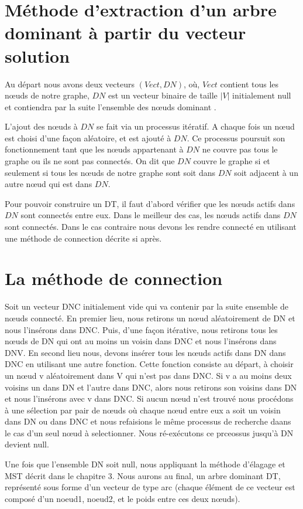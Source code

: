 \section{Méthode d'extraction d'un arbre dominant à partir du vecteur solution}
Au départ nous avons deux vecteurs $(Vect, DN)$, où, $Vect$ contient tous les nœuds de notre graphe, $DN$ est un vecteur binaire de taille $|V|$ initialement null et contiendra par la suite l’ensemble des nœuds dominant .

L’ajout des nœuds à $DN$ se fait via un processus itératif. A chaque fois un nœud est choisi d’une façon aléatoire,  et est ajouté à $DN$. Ce processus poursuit son fonctionnement tant que les nœuds appartenant à $DN$ ne couvre pas tous le graphe ou ils ne sont pas  connectés. On dit que $DN$ couvre le graphe si et seulement si tous les nœuds de notre graphe sont soit dans $DN$ soit adjacent à un autre nœud qui est dans $DN$.

Pour pouvoir construire un DT, il faut d’abord vérifier  que les nœuds actifs dans $DN$  sont connectés entre eux. Dans le meilleur des cas, les nœuds actifs dans $DN$ sont connectés. Dans le cas contraire nous devons les rendre connecté en utilisant une méthode de connection décrite si après.

\section{La méthode de connection}
Soit un vecteur DNC initialement vide qui va contenir par la suite ensemble de nœuds connecté. En premier lieu, nous retirons un nœud aléatoirement de DN et nous l’insérons dans DNC. Puis, d’une façon itérative, nous retirons tous les nœuds de DN qui ont au moins un voisin dans DNC et nous l’insérons dans DNV. En second lieu nous, devons insérer tous les nœuds actifs dans DN dans DNC en utilisant une autre fonction. Cette fonction consiste au départ, à choisir un nœud v aléatoirement dans V qui n’est pas dans DNC. Si v a au moins deux voisins un dans DN et l’autre dans DNC, alors nous retirons son voisins dans DN et nous l’insérons  avec v dans DNC. Si aucun nœud n’est trouvé nous procédons à une sélection par pair de nœuds où chaque nœud entre eux a soit un voisin dans DN ou dans DNC et nous refaisions le même processus de recherche daans le cas d’un seul nœud à selectionner. Nous ré-exécutons ce prceossus jusqu'à DN devient null.

Une fois que l’ensemble DN soit null, nous appliquant la méthode d’élagage et MST décrit dans le chapitre 3. Nous aurons au final, un arbre dominant DT, représenté sous forme d’un vecteur de type arc (chaque élément de ce vecteur est composé d’un noeud1, noeud2, et le poids entre ces deux nœuds).


